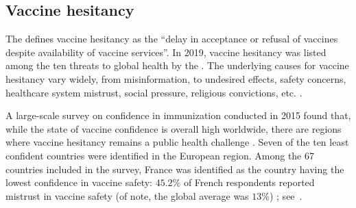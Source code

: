 
\subsection{Vaccine hesitancy}

The \cite{WHO_VaccineHesitancy2014} defines vaccine hesitancy as the ``delay in acceptance or refusal of vaccines despite availability of vaccine services''. In 2019, vaccine hesitancy was listed among the ten threats to global health by the \cite{WHO_10challenges2019}. The underlying causes for vaccine hesitancy vary widely, from misinformation, to undesired effects, safety concerns, healthcare system mistrust, social pressure, religious convictions, etc. \cite[]{Brown2010,Dube2013,Larson2014,Dube2018,Quinn2019}. 

A large-scale survey on confidence in immunization conducted in 2015 found that, while the state of vaccine confidence is overall high worldwide, there are regions where vaccine hesitancy remains a public health challenge \cite[]{Larson2016}. Seven of the ten least confident countries were identified in the European region. Among the 67 countries included in the survey, France was identified as the country having the lowest confidence in vaccine safety: $45.2\%$ of French respondents reported mistrust in vaccine safety (of note, the global average was $13\%$) \cite[]{Larson2016}; see~.

